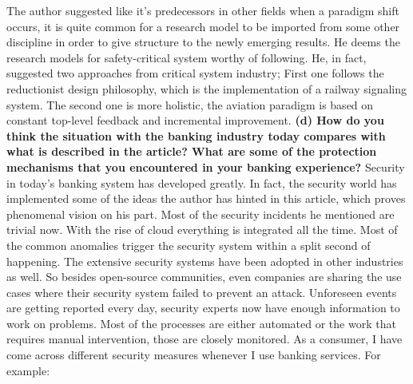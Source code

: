 \documentclass{article}
\begin{document}
\newline \newline The author suggested like it's predecessors in other fields when a paradigm shift occurs, it is quite common for a research model to be imported from some other discipline in order to give structure to the newly emerging results. He deems the research models for safety-critical system worthy of following. He, in fact, suggested two approaches from critical system industry; First one follows the reductionist design philosophy, which is the implementation of a railway signaling system. The second one is more holistic, the aviation paradigm is based on constant top-level feedback and incremental improvement.  
\newline \newline \textbf{(d) How do you think the situation with the banking industry today compares with what is described in the article? What are some of the protection mechanisms that you encountered in your banking experience?}
\newline \newline Security in today's banking system has developed greatly. In fact, the security world has implemented some of the ideas the author has hinted in this article, which proves phenomenal vision on his part. Most of the security incidents he mentioned are trivial now.
\newline \newline With the rise of cloud everything is integrated all the time. Most of the common anomalies trigger the security system within a split second of happening. The extensive security systems have been adopted in other industries as well. So besides open-source communities, even companies are sharing the use cases where their security system failed to prevent an attack. Unforeseen events are getting reported every day, security experts now have enough information to work on problems.
\newline \newline Most of the processes are either automated or the work that requires manual intervention, those are closely monitored.
\newline \newline As a consumer, I have come across different security measures whenever I use banking services. For example: 
\end{document}
